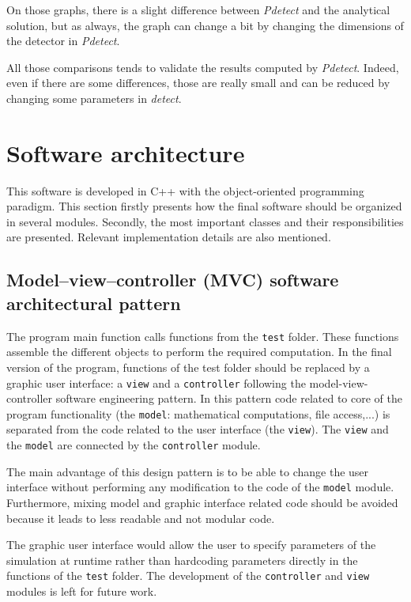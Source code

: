 \documentclass[11pt]{article}
\begin{document}
	On those graphs, there is a slight difference between \textit{Pdetect} and the analytical
	solution, but as always, the graph can change a bit by changing the dimensions of the detector in
	\textit{Pdetect}.

	All those comparisons tends to validate the results computed by \textit{Pdetect}. Indeed, even
	if there are some differences, those are really small and can be reduced by changing some parameters
	in \textit{detect}.

\section{Software architecture} \label{App:soft_arch}

	This software is developed in C++ with the object-oriented programming paradigm.
	This section firstly presents how the final software should be organized in several
	modules. Secondly, the most important classes and their responsibilities are
	presented. Relevant implementation details are also mentioned.

	\subsection{Model–view–controller (MVC) software architectural pattern}

		The program main function calls functions from the \texttt{test} folder. These functions
		assemble the different objects to perform the required computation. In the
		final version of the program, functions of the test folder should be replaced
		by a graphic user interface: a \texttt{view} and a \texttt{controller} following
		the model-view-controller software engineering pattern. In this pattern code
		related to core of the program functionality (the \texttt{model}: mathematical computations, file access,...)
		is separated from the code related to the user interface (the \texttt{view}).
		The \texttt{view} and the
		\texttt{model} are connected by the \texttt{controller} module.

		The main advantage of this design pattern is to be able to change the user interface without
		performing any modification to the code of the \texttt{model} module. Furthermore,
		mixing model and graphic interface related code should be avoided because it leads to
		less readable and not modular code.

		The graphic user interface would allow the user to specify
		parameters of the simulation at runtime rather than hardcoding parameters
		directly in the functions of the \texttt{test} folder.
		The development of the \texttt{controller} and \texttt{view} modules
		is left for future work.
\end{document}
